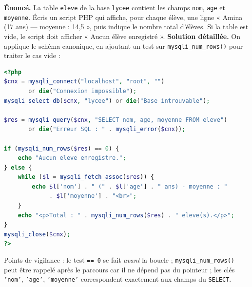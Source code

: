\documentclass[11pt]{article}
\begin{document}
\begin{exoresolu}
\textbf{Énoncé.} La table \texttt{eleve} de la base \texttt{lycee} contient les champs \texttt{nom}, \texttt{age} et \texttt{moyenne}. Écris un script PHP qui affiche, pour chaque élève, une ligne « Amina (17 ans) — moyenne : 14,5 », puis indique le nombre total d'élèves. Si la table est vide, le script doit afficher « Aucun élève enregistré ».
\tcblower
\textbf{Solution détaillée.} On applique le schéma canonique, en ajoutant un test sur \texttt{mysqli\_num\_rows()} pour traiter le cas vide :
\begin{lstlisting}[language=Php]
<?php
$cnx = mysqli_connect("localhost", "root", "")
       or die("Connexion impossible");
mysqli_select_db($cnx, "lycee") or die("Base introuvable");

$res = mysqli_query($cnx, "SELECT nom, age, moyenne FROM eleve")
       or die("Erreur SQL : " . mysqli_error($cnx));

if (mysqli_num_rows($res) == 0) {
    echo "Aucun eleve enregistre.";
} else {
    while ($l = mysqli_fetch_assoc($res)) {
        echo $l['nom'] . " (" . $l['age'] . " ans) - moyenne : "
             . $l['moyenne'] . "<br>";
    }
    echo "<p>Total : " . mysqli_num_rows($res) . " eleve(s).</p>";
}
mysqli_close($cnx);
?>
\end{lstlisting}
Points de vigilance : le test \texttt{== 0} se fait \emph{avant} la boucle ; \texttt{mysqli\_num\_rows()} peut être rappelé après le parcours car il ne dépend pas du pointeur ; les clés \texttt{'nom'}, \texttt{'age'}, \texttt{'moyenne'} correspondent exactement aux champs du \texttt{SELECT}.
\end{exoresolu}
\end{document}
